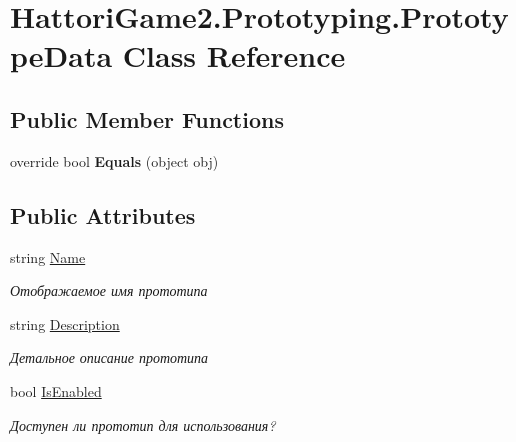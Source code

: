 \hypertarget{class_hattori_game2_1_1_prototyping_1_1_prototype_data}{}\section{Hattori\+Game2.\+Prototyping.\+Prototype\+Data Class Reference}
\label{class_hattori_game2_1_1_prototyping_1_1_prototype_data}
\subsection*{Public Member Functions}
\begin{DoxyCompactItemize}
\item 
\hypertarget{class_hattori_game2_1_1_prototyping_1_1_prototype_data_a0fc2b11db7ca74c5780d18c23cdc09ab}{}override bool {\bfseries Equals} (object obj)\label{class_hattori_game2_1_1_prototyping_1_1_prototype_data_a0fc2b11db7ca74c5780d18c23cdc09ab}

\end{DoxyCompactItemize}
\subsection*{Public Attributes}
\begin{DoxyCompactItemize}
\item 
string \hyperlink{class_hattori_game2_1_1_prototyping_1_1_prototype_data_a516003b06d0fc45830021db7de22068a_a516003b06d0fc45830021db7de22068a}{Name}
\begin{DoxyCompactList}\small\item\em Отображаемое имя прототипа \end{DoxyCompactList}\item 
string \hyperlink{class_hattori_game2_1_1_prototyping_1_1_prototype_data_a8c0f6d49d474ae24964f25064fa90d5d_a8c0f6d49d474ae24964f25064fa90d5d}{Description}
\begin{DoxyCompactList}\small\item\em Детальное описание прототипа \end{DoxyCompactList}\item 
bool \hyperlink{class_hattori_game2_1_1_prototyping_1_1_prototype_data_a84c70c2b7ccac5ccb9ec1ba50084f9fb_a84c70c2b7ccac5ccb9ec1ba50084f9fb}{Is\+Enabled}
\begin{DoxyCompactList}\small\item\em Доступен ли прототип для использования? \end{DoxyCompactList}\end{DoxyCompactItemize}
